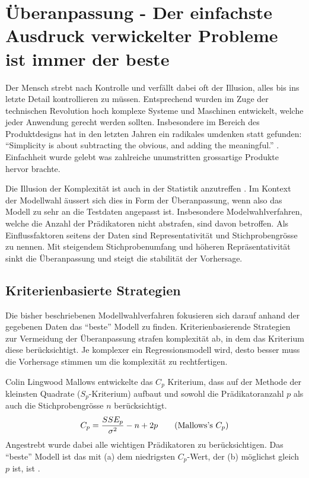 \documentclass[english,12pt,doc]{apa}
\begin{document}
\section{Überanpassung - Der einfachste Ausdruck verwickelter Probleme ist immer der beste}
\label{sparsamkeit}
Der Mensch strebt nach Kontrolle und verfällt dabei oft der Illusion, alles bis ins letzte Detail kontrollieren zu müssen.
Entsprechend wurden im Zuge der technischen Revolution hoch komplexe Systeme und Maschinen entwickelt, welche jeder Anwendung gerecht werden sollten. 
Insbesondere im Bereich des Produktdesigns hat in den letzten Jahren ein radikales umdenken statt gefunden: ``Simplicity is about subtracting the obvious, and adding the meaningful.'' \cite{maeda2006laws}. Einfachheit wurde gelebt was zahlreiche unumstritten grossartige Produkte hervor brachte. 

Die Illusion der Komplexität ist auch in der Statistik anzutreffen \cite[p. 3]{armstrong2011illusions}. 
Im Kontext der Modellwahl äussert sich dies in Form der Überanpassung, wenn also das Modell zu sehr an die Testdaten angepasst ist.
Insbesondere Modelwahlverfahren, welche die Anzahl der Prädikatoren nicht abstrafen, sind davon betroffen.
Als Einflussfaktoren seitens der Daten sind Representativität und Stichprobengrösse zu nennen. 
Mit steigendem Stichprobenumfang und höheren Repräsentativität sinkt die Überanpassung und steigt die stabilität der Vorhersage.


\subsection{Kriterienbasierte Strategien}
Die bisher beschriebenen Modellwahlverfahren fokusieren sich darauf anhand der gegebenen Daten das ``beste'' Modell zu finden.
Kriterienbasierende Strategien zur Vermeidung der Überanpassung strafen komplexität ab, in dem das Kriterium diese berücksichtigt.
Je komplexer ein Regressionsmodell wird, desto besser muss die Vorhersage stimmen um die komplexität zu rechtfertigen.

Colin Lingwood Mallows entwickelte das $C_p$ Kriterium, dass auf der Methode der kleinsten Quadrate ($S_p$-Kriterium) aufbaut und sowohl die Prädikatoranzahl $p$ als auch die Stichprobengrösse $n$ berücksichtigt. 
\begin{equation}
C_p={SSE_p \over \sigma^2} - n + 2p
\tag{Mallows's $C_p$}
\end{equation}
Angestrebt wurde dabei alle wichtigen Prädikatoren zu berücksichtigen. 
Das ``beste'' Modell ist das mit (a) dem niedrigsten $C_p$-Wert, der (b) möglichst gleich $p$ ist, ist \cite{gilmour1996interpretation}.
\end{document}
